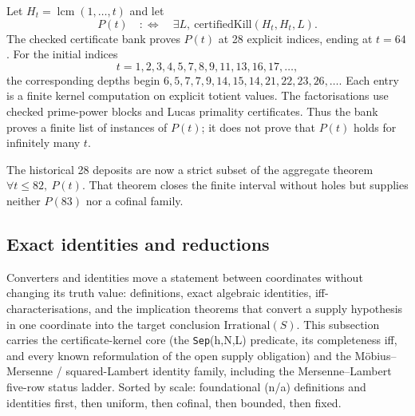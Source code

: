 \begin{prop}
Let $H_t=\operatorname{lcm}(1,\ldots,t)$ and let
\[
P(t)\quad:\Longleftrightarrow\quad \exists L,\ \mathrm{certifiedKill}(H_t,H_t,L).
\]
The checked certificate bank proves $P(t)$ at 28 explicit indices, ending at $t=64$.
For the initial indices
\[
t=1,2,3,4,5,7,8,9,11,13,16,17,\ldots,
\]
the corresponding depths begin
$6,5,7,7,9,14,15,14,21,22,23,26,\ldots$.
Each entry is a finite kernel computation on explicit totient values. The factorisations use
checked prime-power blocks and Lucas primality certificates. Thus the bank proves a finite list
of instances of $P(t)$; it does not prove that $P(t)$ holds for infinitely many $t$.
\par\noindent{}     

The historical 28 deposits are now a strict subset of the aggregate theorem
$\forall t\le82,\ P(t)$.  That theorem closes the finite interval without
holes but supplies neither $P(83)$ nor a cofinal family.
\par\noindent{}  
\end{prop}

\subsection{Exact identities and reductions}

Converters and identities move a statement between coordinates without changing its
truth value: definitions, exact algebraic identities, iff-characterisations, and the
implication theorems that convert a supply hypothesis in one coordinate into the target
conclusion $\mathrm{Irrational}(S)$. This subsection carries the certificate-kernel core
(the \texttt{Sep}(h,N,L) predicate, its completeness iff, and every known reformulation
of the open supply obligation) and the M\"obius--Mersenne / squared-Lambert identity
family, including the Mersenne--Lambert five-row status ladder. Sorted by scale:
foundational (n/a) definitions and identities first, then uniform, then cofinal, then
bounded, then fixed.

